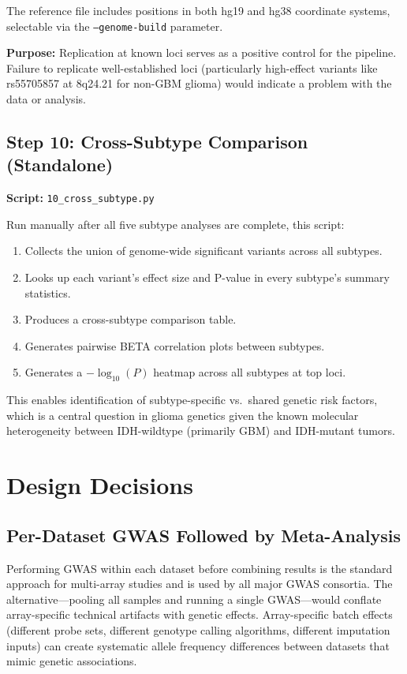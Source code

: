 \documentclass[11pt,letterpaper]{article}
\begin{document}
The reference file includes positions in both hg19 and hg38 coordinate systems, selectable via the \texttt{--genome-build} parameter.

\textbf{Purpose:} Replication at known loci serves as a positive control for the pipeline. Failure to replicate well-established loci (particularly high-effect variants like rs55705857 at 8q24.21 for non-GBM glioma) would indicate a problem with the data or analysis.

\subsection{Step 10: Cross-Subtype Comparison (Standalone)}
\label{sec:step10}

\textbf{Script:} \texttt{10\_cross\_subtype.py}

Run manually after all five subtype analyses are complete, this script:

\begin{enumerate}[nosep]
    \item Collects the union of genome-wide significant variants across all subtypes.
    \item Looks up each variant's effect size and P-value in every subtype's summary statistics.
    \item Produces a cross-subtype comparison table.
    \item Generates pairwise BETA correlation plots between subtypes.
    \item Generates a $-\log_{10}(P)$ heatmap across all subtypes at top loci.
\end{enumerate}

This enables identification of subtype-specific vs.\ shared genetic risk factors, which is a central question in glioma genetics given the known molecular heterogeneity between IDH-wildtype (primarily GBM) and IDH-mutant tumors.

\section{Design Decisions}

\subsection{Per-Dataset GWAS Followed by Meta-Analysis}

Performing GWAS within each dataset before combining results is the standard approach for multi-array studies and is used by all major GWAS consortia. The alternative---pooling all samples and running a single GWAS---would conflate array-specific technical artifacts with genetic effects. Array-specific batch effects (different probe sets, different genotype calling algorithms, different imputation inputs) can create systematic allele frequency differences between datasets that mimic genetic associations.
\end{document}
